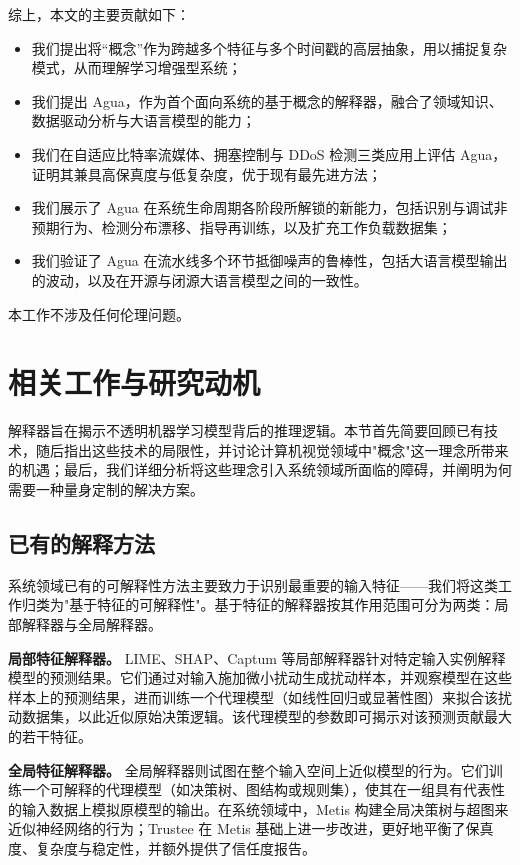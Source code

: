 \documentclass[11pt,a4paper]{article}
\begin{document}
综上，本文的主要贡献如下：
\begin{itemize}[leftmargin=1.5em]
\item 我们提出将“概念”作为跨越多个特征与多个时间戳的高层抽象，用以捕捉复杂模式，从而理解学习增强型系统；
\item 我们提出 Agua，作为首个面向系统的基于概念的解释器，融合了领域知识、数据驱动分析与大语言模型的能力；
\item 我们在自适应比特率流媒体、拥塞控制与 DDoS 检测三类应用上评估 Agua，证明其兼具高保真度与低复杂度，优于现有最先进方法；
\item 我们展示了 Agua 在系统生命周期各阶段所解锁的新能力，包括识别与调试非预期行为、检测分布漂移、指导再训练，以及扩充工作负载数据集；
\item 我们验证了 Agua 在流水线多个环节抵御噪声的鲁棒性，包括大语言模型输出的波动，以及在开源与闭源大语言模型之间的一致性。
\end{itemize}

本工作不涉及任何伦理问题。

\section{相关工作与研究动机}

解释器旨在揭示不透明机器学习模型背后的推理逻辑。本节首先简要回顾已有技术，随后指出这些技术的局限性，并讨论计算机视觉领域中"概念"这一理念所带来的机遇；最后，我们详细分析将这些理念引入系统领域所面临的障碍，并阐明为何需要一种量身定制的解决方案。

\subsection{已有的解释方法}

系统领域已有的可解释性方法主要致力于识别最重要的输入特征——我们将这类工作归类为"基于特征的可解释性"。基于特征的解释器按其作用范围可分为两类：局部解释器与全局解释器。

\textbf{局部特征解释器。} LIME、SHAP、Captum 等局部解释器针对特定输入实例解释模型的预测结果。它们通过对输入施加微小扰动生成扰动样本，并观察模型在这些样本上的预测结果，进而训练一个代理模型（如线性回归或显著性图）来拟合该扰动数据集，以此近似原始决策逻辑。该代理模型的参数即可揭示对该预测贡献最大的若干特征。

\textbf{全局特征解释器。} 全局解释器则试图在整个输入空间上近似模型的行为。它们训练一个可解释的代理模型（如决策树、图结构或规则集），使其在一组具有代表性的输入数据上模拟原模型的输出。在系统领域中，Metis 构建全局决策树与超图来近似神经网络的行为；Trustee 在 Metis 基础上进一步改进，更好地平衡了保真度、复杂度与稳定性，并额外提供了信任度报告。
\end{document}

